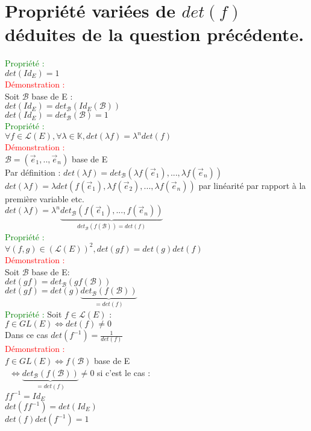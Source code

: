 \documentclass{article}
\begin{document}
	\section{Propriété variées de $det(f)$ déduites de la question précédente.}
	\textcolor{green}{Propriété :} \\
	$det(Id_E)=1$ \\
	\textcolor{red}{Démonstration :} \\
	Soit $\mathcal B$ base de E : \\
	$det(Id_E)=det_{\mathcal B}(Id_E(\mathcal B))$ \\
	$det(Id_E)=det_{\mathcal B}(\mathcal B)=1$ \\
	\textcolor{green}{Propriété :} \\
	$\forall f \in \mathcal L(E), \forall \lambda \in \mathbb K, det(\lambda f) =\lambda^ndet(f)$ \\
	\textcolor{red}{Démonstration :} \\
	$\mathcal B=(\vec e_1,.., \vec e_n)$ base de E \\
	Par définition : $det(\lambda f)= det_{\mathcal B}(\lambda f(\vec e_1),...,\lambda f(\vec e_n))$ \\
	$det(\lambda f)=\lambda det(f(\vec e_1), \lambda f(\vec e_2),..., \lambda f(\vec e_n))$ par linéarité par rapport à la première variable
	etc. \\
	$det(\lambda f) = \lambda^n \underbrace{det_{\mathcal B}(f(\vec e_1),...,f(\vec e_n))}_{det_{\mathcal B}(f(\mathcal B))=det(f)}$ \\
	\textcolor{green}{Propriété :} \\
	$\forall (f,g) \in (\mathcal L(E))^2,det(gf)=det(g)det(f)$ \\
	\textcolor{red}{Démonstration :} \\
	Soit $\mathcal B$ base de E: \\
	$det(gf)=det_{\mathcal B}(gf(\mathcal B))$ \\
	$det(gf)=det(g) \underbrace{det_{\mathcal B}(f(\mathcal B))}_{=det(f)}$ \\
	\textcolor{green}{Propriété :} Soit $f\in \mathcal L(E)$ : \\
	$f \in GL(E) \Leftrightarrow det(f) \neq 0$ \\
	Dans ce cas $det(f^{-1})=\frac{1}{det(f)}$ \\
	\textcolor{red}{Démonstration :} \\
	$f \in GL(E) \Leftrightarrow f(\mathcal B)$ base de E \\\
	$\Leftrightarrow \underbrace{det_{\mathcal B}(f(\mathcal B))}_{=det(f)} \neq 0$
	si c'est le cas : \\
	$f f^{-1}=Id_E$ \\
	$det(ff^{-1})=det(Id_E)$ \\
	$det(f)det(f^{-1})=1$
\end{document}
